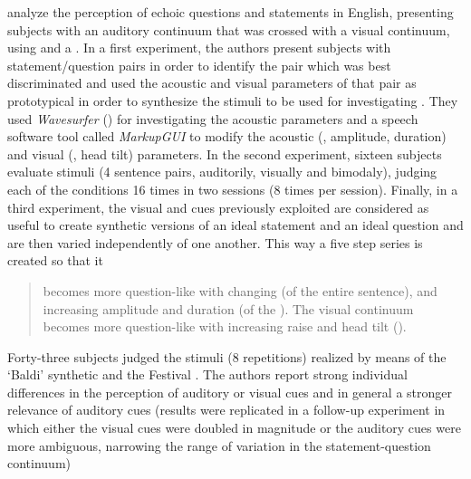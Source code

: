 \documentclass[output=paper]{langsci/langscibook}
\begin{document}
\citet{Srinivasan2003} analyze the perception of echoic questions and statements in English, presenting subjects with an auditory continuum that was crossed with a visual continuum, using  and a . In a first experiment, the authors present subjects with statement\slash question pairs in order to identify the pair which was best discriminated and used the acoustic and visual parameters of that pair as prototypical in order to synthesize the stimuli to be used for investigating . They used \textit{Wavesurfer} (\citealt{Sjolander.1999}) for investigating the acoustic parameters and a speech software tool called \textit{MarkupGUI} \citep{Wouters1999} to modify the acoustic (, amplitude, duration) and visual (, head tilt) parameters. In the second experiment, sixteen subjects evaluate stimuli (4 sentence pairs, auditorily, visually and bimodaly), judging each of the conditions 16 times in two sessions (8 times per session). Finally, in a third experiment, the visual and  cues previously exploited are considered as useful to create synthetic versions of an ideal statement and an ideal question and are then varied independently of one another. This way a five step series is created so that it

\begin{quote}
becomes more question-like with changing  (of the entire sentence), and increasing amplitude and duration (of the ). The visual continuum becomes more question-like with increasing  raise and head tilt (\citealt[9]{Srinivasan2003}).
\end{quote}

Forty-three subjects judged the stimuli (8 repetitions) realized by means of the ‘Baldi’ synthetic  and the Festival . The authors report strong individual differences in the perception of auditory or visual cues and in general a stronger relevance of auditory cues (results were replicated in a follow-up experiment in which either the visual cues were doubled in magnitude or the auditory cues were more ambiguous, narrowing the range of variation in the statement-question continuum)
\end{document}
